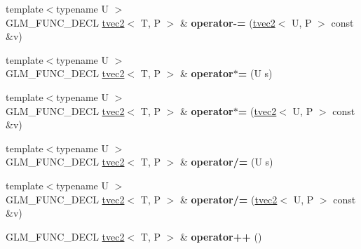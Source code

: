 \begin{DoxyCompactItemize}
\item 
{\footnotesize template$<$typename U $>$ }\\G\+L\+M\+\_\+\+F\+U\+N\+C\+\_\+\+D\+E\+CL \hyperlink{structglm_1_1detail_1_1tvec2}{tvec2}$<$ T, P $>$ \& {\bfseries operator-\/=} (\hyperlink{structglm_1_1detail_1_1tvec2}{tvec2}$<$ U, P $>$ const \&v)\hypertarget{structglm_1_1detail_1_1tvec2_a9ab59a567b117ba933525ca8acec41cb}{}\label{structglm_1_1detail_1_1tvec2_a9ab59a567b117ba933525ca8acec41cb}

\item 
{\footnotesize template$<$typename U $>$ }\\G\+L\+M\+\_\+\+F\+U\+N\+C\+\_\+\+D\+E\+CL \hyperlink{structglm_1_1detail_1_1tvec2}{tvec2}$<$ T, P $>$ \& {\bfseries operator$\ast$=} (U s)\hypertarget{structglm_1_1detail_1_1tvec2_a8fa08d83addcb4ba1f57efc4be5644cc}{}\label{structglm_1_1detail_1_1tvec2_a8fa08d83addcb4ba1f57efc4be5644cc}

\item 
{\footnotesize template$<$typename U $>$ }\\G\+L\+M\+\_\+\+F\+U\+N\+C\+\_\+\+D\+E\+CL \hyperlink{structglm_1_1detail_1_1tvec2}{tvec2}$<$ T, P $>$ \& {\bfseries operator$\ast$=} (\hyperlink{structglm_1_1detail_1_1tvec2}{tvec2}$<$ U, P $>$ const \&v)\hypertarget{structglm_1_1detail_1_1tvec2_a37dcc7e738554b854e6c2352cd83a567}{}\label{structglm_1_1detail_1_1tvec2_a37dcc7e738554b854e6c2352cd83a567}

\item 
{\footnotesize template$<$typename U $>$ }\\G\+L\+M\+\_\+\+F\+U\+N\+C\+\_\+\+D\+E\+CL \hyperlink{structglm_1_1detail_1_1tvec2}{tvec2}$<$ T, P $>$ \& {\bfseries operator/=} (U s)\hypertarget{structglm_1_1detail_1_1tvec2_af6469124c24ce8b406467d7f006f388d}{}\label{structglm_1_1detail_1_1tvec2_af6469124c24ce8b406467d7f006f388d}

\item 
{\footnotesize template$<$typename U $>$ }\\G\+L\+M\+\_\+\+F\+U\+N\+C\+\_\+\+D\+E\+CL \hyperlink{structglm_1_1detail_1_1tvec2}{tvec2}$<$ T, P $>$ \& {\bfseries operator/=} (\hyperlink{structglm_1_1detail_1_1tvec2}{tvec2}$<$ U, P $>$ const \&v)\hypertarget{structglm_1_1detail_1_1tvec2_ad98620351ffef7d39ec7111a6be108ce}{}\label{structglm_1_1detail_1_1tvec2_ad98620351ffef7d39ec7111a6be108ce}

\item 
G\+L\+M\+\_\+\+F\+U\+N\+C\+\_\+\+D\+E\+CL \hyperlink{structglm_1_1detail_1_1tvec2}{tvec2}$<$ T, P $>$ \& {\bfseries operator++} ()\hypertarget{structglm_1_1detail_1_1tvec2_a9678bb2f72ed6a99f99ada6aab54a0ad}{}\label{structglm_1_1detail_1_1tvec2_a9678bb2f72ed6a99f99ada6aab54a0ad}


\end{DoxyCompactItemize}
